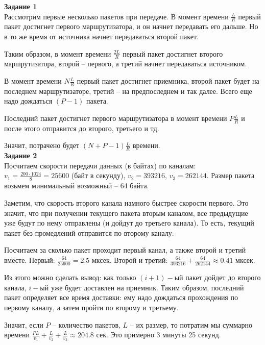 \documentclass[11pt]{article}
\begin{document}
{\bf Задание 1}\\

Рассмотрим первые несколько пакетов при передаче.
В момент времени $\frac{L}{R}$ первый пакет достигнет первого маршрутизатора, и он начнет передавать его дальше.
Но в то же время от источника начнет передаваться второй пакет.

Таким образом, в момент времени $\frac{2L}{R}$ первый пакет достигнет второго маршрутизатора, второй -- первого, а третий начнет передаваться источником.

В момент времени $N \frac{L}{R}$ первый пакет достигнет приемника, второй пакет будет на последнем маршрутизаторе, третий -- на предпоследнем и так далее.
Всего еще надо дождаться $(P - 1)$ пакета.

Последний пакет достигнет первого маршрутизатора в момент времени $P \frac{L}{R}$ и после этого отправится до второго, третьего и тд.

Значит, потрачено будет $(N+P-1) \frac{L}{R}$ времени.\\

{\bf Задание 2}\\

Посчитаем скорости передачи данных (в байтах) по каналам: $v_1 = \frac{200 \cdot 1024}{8} = 25600$ (байт в секунду), $v_2 = 393216$, $v_3 = 262144$.
Размер пакета возьмем минимальный возможный -- 64 байта.

Заметим, что скорость второго канала намного быстрее скорости первого.
Это значит, что при получении текущего пакета вторым каналом, все предыдущие уже будут по нему отправлены (и дойдут до третьего канала).
То есть, текущий пакет без промедлений отправится по второму каналу.

Посчитаем за сколько пакет проходит первый канал, а также второй и третий вместе.
Первый: $\frac{64}{25600} = 2.5$ мксек.
Второй и третий: $\frac{64}{393216} + \frac{64}{262144} \approx 0.41$ мксек.

Из этого можно сделать вывод: как только $(i + 1)-$ый пакет дойдет до второго канала, $i-$ый уже будет доставлен на приемник.
Таким образом, последний пакет определяет все время доставки: ему надо дождаться прохождения по первому каналу, а затем пройти по второму и третьему.

Значит, если $P$ -- количество пакетов, $L$ -- их размер, то потратим мы суммарно времени $\frac{PL}{v_1} + \frac{L}{v_2} + \frac{L}{v_3} \approx 204.8$ сек.
Это примерно 3 минуты 25 секунд.\\
\end{document}
